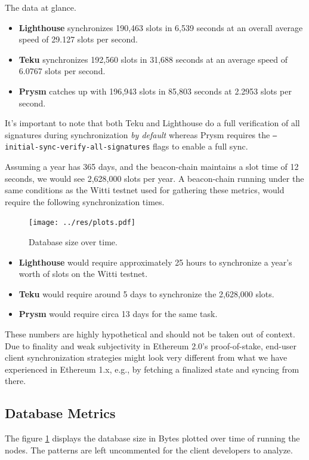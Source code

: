 \documentclass[twoside,twocolumn]{article}
\begin{document}
The data at glance.
\begin{itemize}
\item \textbf{Lighthouse} synchronizes 190,463 slots in 6,539 seconds at an overall average speed of 29.127 slots per second.
\item \textbf{Teku} synchronizes 192,560 slots in 31,688 seconds at an average speed of 6.0767 slots per second.
\item \textbf{Prysm} catches up with 196,943 slots in 85,803 seconds at 2.2953 slots per second.
\end{itemize}

It's important to note that both Teku and Lighthouse do a full verification of all signatures during synchronization \textit{by default} whereas Prysm requires the \texttt{--initial-sync-verify-all-signatures} flags to enable a full sync.\par

Assuming a year has 365 days, and the beacon-chain maintains a slot time of 12 seconds, we would see 2,628,000 slots per year. A beacon-chain running under the same conditions as the Witti testnet used for gathering these metrics, would require the following synchronization times.

\begin{figure}[t]
	\centering
	\texttt{[image: ../res/plots.pdf]}
	\caption{Database size over time.}
	\label{img:db}
\end{figure}

\begin{itemize}
\item \textbf{Lighthouse} would require approximately 25 hours to synchronize a year's worth of slots on the Witti testnet.
\item \textbf{Teku} would require around 5 days to synchronize the 2,628,000 slots.
\item \textbf{Prysm} would require circa 13 days for the same task.
\end{itemize}

These numbers are highly hypothetical and should not be taken out of context. Due to finality and weak subjectivity in Ethereum 2.0's proof-of-stake, end-user client synchronization strategies might look very different from what we have experienced in Ethereum 1.x, e.g., by fetching a finalized state and syncing from there.\par

\subsection{Database Metrics}
The figure \ref{img:db} displays the database size in Bytes plotted over time of running the nodes. The patterns are left uncommented for the client developers to analyze.\par
\end{document}
